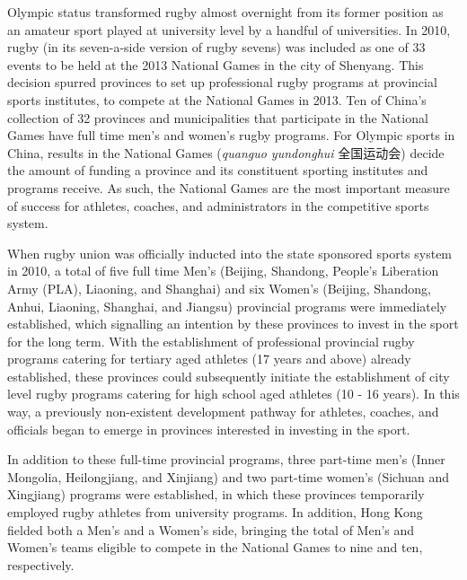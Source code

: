\begin{CJK}{UTF8}{gbsn}
Olympic status transformed rugby almost overnight from its former position as an amateur sport played at university level by a handful of universities.  In 2010, rugby (in its seven-a-side version of rugby sevens) was included as one of 33 events to be held at the 2013 National Games in the city of Shenyang. This decision spurred provinces to set up professional rugby programs at provincial sports institutes, to compete at the National Games in 2013.  Ten of China's collection of 32 provinces and municipalities that participate in the National Games have full time men's and women's rugby programs.  For Olympic sports in China, results in the National Games (\textit{quanguo yundonghui} 全国运动会) decide the amount of funding a province and its constituent sporting institutes and programs receive.  As such, the National Games are the most important measure of success \citep{Hong2002} for athletes, coaches, and administrators in the competitive sports system.

When rugby union was officially inducted into the state sponsored sports system in 2010, a total of five full time Men's (Beijing, Shandong, People's Liberation Army (PLA), Liaoning, and Shanghai) and six Women's (Beijing, Shandong, Anhui, Liaoning, Shanghai, and Jiangsu) provincial programs were immediately established, which signalling an intention by these provinces to invest in the sport for the long term.  With the establishment of professional provincial rugby programs catering for tertiary aged athletes (17 years and above) already established, these provinces could subsequently initiate the establishment of city level rugby programs catering for high school aged athletes (10 - 16 years).  In this way, a previously non-existent development pathway for athletes, coaches, and officials began to emerge in provinces interested in investing in the sport.

In addition to these full-time provincial programs, three part-time men's (Inner Mongolia, Heilongjiang, and Xinjiang) and two part-time women's (Sichuan and Xingjiang) programs were established, in which these provinces temporarily employed rugby athletes from university programs. In addition, Hong Kong fielded both a Men's and a Women's side, bringing the total of Men's and Women's teams eligible to compete in the National Games to nine and ten, respectively.


\end{CJK}
